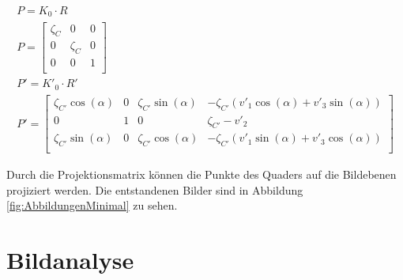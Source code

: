 \begin{gather}
P = K_0\cdot R \\
P =
\begin{bmatrix}
\zeta_{C}&0&0\\
0&\zeta_{C}&0\\
0&0&1\\
\end{bmatrix}\\
P' = K'_0 \cdot R'\\
P' =
\begin{bmatrix}
\zeta_{C'} \cos(\alpha)&0&\zeta_{C'} \sin(\alpha)&-\zeta_{C'} (v'_1\cos(\alpha)+v'_3\sin(\alpha) )\\
0&1&0&\zeta_{C'}-v'_2\\
\zeta_{C'}\sin(\alpha)&0&\zeta_{C'}\cos(\alpha)&-\zeta_{C'}(v'_1\sin(\alpha)+v'_3\cos(\alpha))\\
\end{bmatrix}
\end{gather}



%
Durch die Projektionsmatrix können die Punkte des Quaders auf die Bildebenen projiziert werden. Die entstandenen Bilder sind in Abbildung \ref{fig:AbbildungenMinimal} zu sehen. 




\section{Bildanalyse}
\label{sec:MinimalFun}

